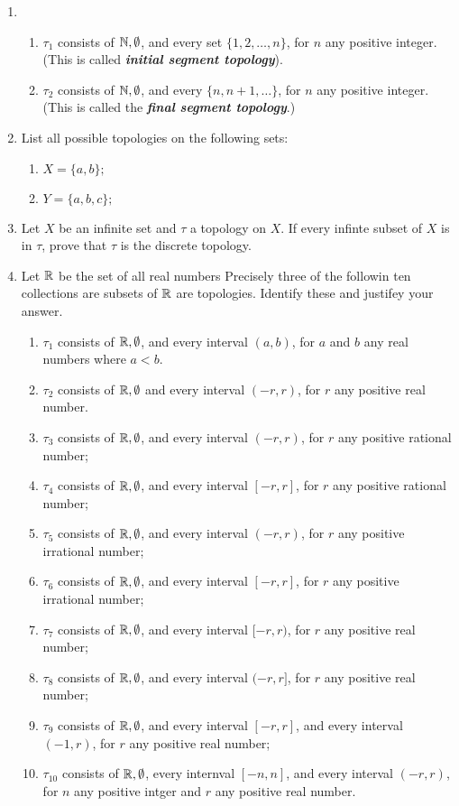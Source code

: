 \documentclass[10pt,a4paper]{report}
\begin{document}
\begin{enumerate}
\item 
\begin{enumerate}[label=(\roman*)]
	\item $\tau_1$ consists of $\mathbb{N}, \emptyset$, and every set $\{1,2,\dots,n\}$, for $n$ any positive integer. (This is called \textbf{\textit{initial segment topology}}).
	\item $\tau_2$ consists of $\mathbb{N},\emptyset$, and every $\{n, n+1, \dots\}$, for $n$ any positive integer. (This is called the \textbf{\textit{final segment topology}}.)
\end{enumerate}

\item List all possible topologies on the following sets:
\begin{enumerate}
	\item $X = \{a,b\};$
	\item $Y = \{a,b,c\};$
\end{enumerate}

\item Let $X$ be an infinite set and $\tau$ a topology on $X$.  If every infinte subset of $X$ is in $\tau$, prove that $\tau$ is the discrete topology.

\item Let $\mathbb{R}$ be the set of all real numbers Precisely three of the followin ten collections are subsets of $\mathbb{R}$ are topologies.  Identify these and justifey your answer.
\begin{enumerate}[label=(\roman*)]
	\item $\tau_1$ consists of $\mathbb{R}, \emptyset$, and every interval $(a,b)$, for $a$ and $b$ any real numbers where $a<b$.
	\item $\tau_2$ consists of $\mathbb{R}, \emptyset$ and every interval $(-r,r)$, for $r$ any positive real number.
	\item $\tau_3$ consists of $\mathbb{R},\emptyset$, and every interval $(-r,r)$, for $r$ any positive rational number;
	\item $\tau_4$ consists of $\mathbb{R},\emptyset$, and every interval $[-r,r]$, for $r$ any positive rational number;
	\item $\tau_5$ consists of $\mathbb{R},\emptyset$, and every interval $(-r,r)$, for $r$ any positive irrational number;
	\item $\tau_6$ consists of $\mathbb{R},\emptyset$, and every interval $[-r,r]$, for $r$ any positive irrational number;
	\item $\tau_7$ consists of $\mathbb{R},\emptyset$, and every interval $[-r,r)$, for $r$ any positive real number;
	\item $\tau_8$ consists of $\mathbb{R},\emptyset$, and every interval $(-r,r]$, for $r$ any positive real number;
	\item $\tau_9$ consists of $\mathbb{R},\emptyset$, and every interval $[-r,r]$,  and every interval $(-1,r)$, for $r$ any positive real number;
	\item $\tau_{10}$ consists of $\mathbb{R}, \emptyset$, every internval $[-n,n]$, and every interval $(-r,r)$, for $n$ any positive intger and $r$ any positive real number.
\end{enumerate}

\end{enumerate}
\end{document}
